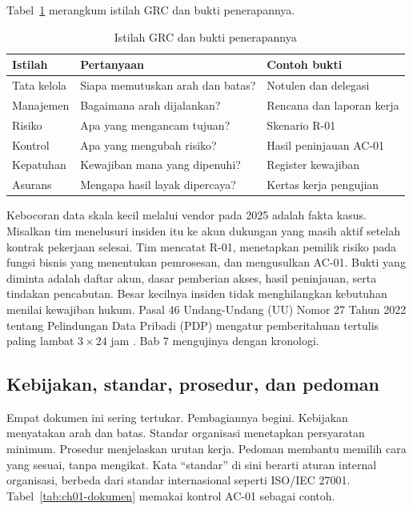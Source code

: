 Tabel~\ref{tab:ch01-istilah} merangkum istilah GRC dan bukti penerapannya.
\begin{table}[!htb]
  \centering\small
  \caption{Istilah GRC dan bukti penerapannya}\label{tab:ch01-istilah}
  \begin{tabularx}{\textwidth}{|>{\raggedright\arraybackslash}p{}|>{\raggedright\arraybackslash}X|>{\raggedright\arraybackslash}X|}
    \hline
    \textbf{Istilah} & \textbf{Pertanyaan} & \textbf{Contoh bukti} \\ \hline
    Tata kelola & Siapa memutuskan arah dan batas? & Notulen dan delegasi \\ \hline
    Manajemen & Bagaimana arah dijalankan? & Rencana dan laporan kerja \\ \hline
    Risiko & Apa yang mengancam tujuan? & Skenario R-01 \\ \hline
    Kontrol & Apa yang mengubah risiko? & Hasil peninjauan AC-01 \\ \hline
    Kepatuhan & Kewajiban mana yang dipenuhi? & Register kewajiban \\ \hline
    Asurans & Mengapa hasil layak dipercaya? & Kertas kerja pengujian \\ \hline
  \end{tabularx}
\end{table}

\begin{kasus}[title={Kasus Medikara Health: Dari Insiden ke Pemilik Keputusan}]
Kebocoran data skala kecil melalui vendor pada 2025 adalah fakta kasus. Misalkan tim
menelusuri insiden itu ke akun dukungan yang masih aktif setelah kontrak pekerjaan
selesai. Tim mencatat R-01, menetapkan pemilik risiko pada fungsi bisnis yang menentukan
pemrosesan, dan mengusulkan AC-01. Bukti yang diminta adalah daftar akun, dasar
pemberian akses, hasil peninjauan, serta tindakan pencabutan. Besar kecilnya insiden
tidak menghilangkan kebutuhan menilai kewajiban hukum. Pasal 46 Undang-Undang (UU) Nomor
27 Tahun 2022 tentang Pelindungan Data Pribadi (PDP) mengatur pemberitahuan tertulis paling
lambat $3 \times 24$ jam \cite{uu27-2022-pdp}. Bab 7 mengujinya dengan kronologi.
\end{kasus}

\subsection*{Kebijakan, standar, prosedur, dan pedoman}

Empat dokumen ini sering tertukar. Pembagiannya begini. Kebijakan menyatakan arah dan
batas. Standar organisasi menetapkan persyaratan minimum. Prosedur menjelaskan urutan
kerja. Pedoman membantu memilih cara yang sesuai, tanpa mengikat. Kata ``standar'' di sini
berarti aturan internal organisasi, berbeda dari standar internasional seperti ISO/IEC
27001. Tabel~\ref{tab:ch01-dokumen} memakai kontrol AC-01 sebagai contoh.

